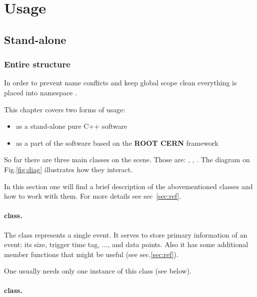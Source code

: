 \newpage
\section{Usage}
\subsection{Stand-alone}
\subsubsection{Entire structure}\label{ssec:ent_str}
In order to prevent name conflicts and keep global scope clean everything is placed into
namespace .

This chapter covers two forms of usage:
\begin{itemize}
    \item as a stand-alone pure C++ software
    \item as a part of the software based on the \textbf{ROOT CERN} framework
\end{itemize}


So far there are three main classes on the scene. Those are: , ,
.
The diagram on Fig.\ref{fig:diag} illustrates how they interact. 



In this section one will find a brief description of the abovementioned classes and how to work with them.
For more details see sec~\ref{sec:ref}.

\paragraph*{ class.}

The  class represents a single event. It serves to store primary information
of an event: its size, trigger time tag, ..., and data points. Also it has some additional 
member functions that might be useful (see sec.\ref{sec:ref}).

One usually needs only one instance of this class (see below).

\paragraph*{ class.}

